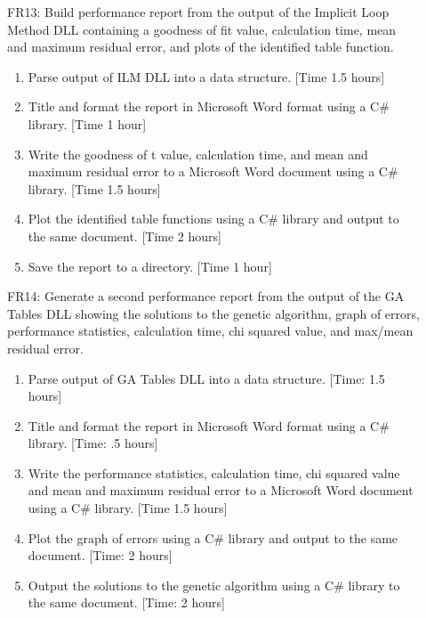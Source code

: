 \documentclass[pdftex,10pt,a4paper]{article}
\begin{document}
\begin{description}
\item[] FR13: Build performance report from the output of the Implicit Loop Method DLL containing a goodness of fit value, calculation time, mean and maximum residual error, and plots of the identified table function.
\begin{enumerate}
\item Parse output of ILM DLL into a data structure. [Time 1.5 hours]
\item Title and format the report in Microsoft Word format using a C\# library. [Time 1 hour]
\item Write the goodness of t value, calculation time, and mean and maximum residual error to a Microsoft Word document using a C\# library. [Time 1.5 hours]
\item Plot the identified table functions using a C\# library and output to the same document. [Time 2 hours]
\item Save the report to a directory. [Time 1 hour]
\end{enumerate}

\item[] FR14: Generate a second performance report from the output of the GA Tables DLL showing the solutions to the genetic algorithm, graph of errors, performance statistics, calculation time, chi squared value, and max/mean residual error.
\begin{enumerate}
\item Parse output of GA Tables DLL into a data structure. [Time: 1.5 hours]
\item Title and format the report in Microsoft Word format using a C\# library. [Time: .5 hours]
\item Write the performance statistics, calculation time, chi squared value and mean and maximum residual error to a Microsoft Word document using a C\# library. [Time 1.5 hours]
\item Plot the graph of errors using a C\# library and output to the same document. [Time: 2 hours]
\item Output the solutions to the genetic algorithm using a C\# library to the same document. [Time: 2 hours]
\end{enumerate}


\end{description}
\end{document}
